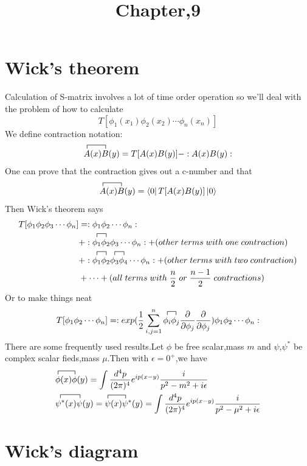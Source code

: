 \documentclass[a4paper]{article}
\begin{document}
	\title{Chapter,9}
	\date{ }
	\maketitle
\section{Wick's theorem}
Calculation of S-matrix involves a lot of time order operation so we'll deal with the problem of how to calculate$$T[\phi_1(x_1)\phi_2(x_2)\cdots\phi_n(x_n)]$$We define contraction notation:$$\contraction{}{A}{(x)}{B}A(x)B(y)=T[A(x)B(y)]-:A(x)B(y):$$One can prove that the contraction gives out a c-number and that $$\contraction{}{A}{(x)}{B}A(x)B(y)=\bra{0}T[A(x)B(y)]\ket{0}$$Then Wick's theorem says
\begin{align*}
	T[\phi_1\phi_2\phi_3\cdots\phi_n]&=:\phi_1\phi_2\cdots\phi_n:\\
	&+:\contraction{}{\phi_1}{}{\phi_2}\phi_1\phi_2\phi_3\cdots\phi_n:+(other\;terms\;with\;one\;contraction)\\&+:\contraction{}{\phi_1}{}{\phi_2}\phi_1\phi_2\contraction{}{\phi_3}{}{\phi_4}\phi_3\phi_4\cdots\phi_n:+(other\;terms\;with\;two\;contraction)\\&+\cdots+(all\;terms\;with\;\frac{n}{2}\;or\;\frac{n-1}{2}\;contractions)
\end{align*}
Or to make things neat$$T[\phi_1\phi_2\cdots\phi_n]=:exp(\frac{1}{2}\sum_{i,j=1}^{n}\contraction{}{\phi_i}{}{\phi_j}\phi_i\phi_j\frac{\partial}{\partial\phi_j}\frac{\partial}{\partial\phi_j})\phi_1\phi_2\cdots\phi_n:$$
There are some frequently used results.Let $\phi$ be free scalar,mass $m$ and $\psi$,$\psi^*$ be complex scalar fieds,mass $\mu$.Then with $\epsilon=0^+$,we have
\begin{align*}
	&\contraction{}{\phi}{(x)}{\phi}\phi(x)\phi(y)=\int\frac{d^4p}{(2\pi)^4}e^{ip(x-y)}\frac{i}{p^2-m^2+i\epsilon}\\
	&\contraction{}{\psi^*}{(x)}{\psi}\psi^*(x)\psi(y)=\contraction{}{\psi}{(x)}{\psi}\psi(x)\psi^*(y)=\int\frac{d^4p}{(2\pi)^4}e^{ip(x-y)}\frac{i}{p^2-\mu^2+i\epsilon}
\end{align*}
\section{Wick's diagram}
\end{document}
